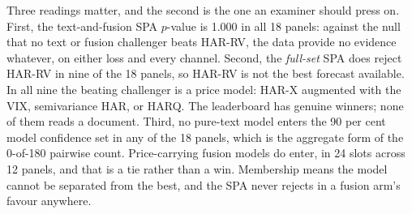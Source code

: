 Three readings matter, and the second is the one an examiner should press
on. First, the text-and-fusion SPA $p$-value is 1.000 in all 18 panels:
against the null that no text or fusion challenger beats HAR-RV, the data
provide no evidence whatever, on either loss and every channel. Second,
the \emph{full-set} SPA does reject HAR-RV in nine of the 18 panels, so
HAR-RV is not the best forecast available. In all nine the beating
challenger is a price model: HAR-X augmented with the VIX, semivariance
HAR, or HARQ. The leaderboard has genuine winners; none of them reads a
document. Third, no pure-text model enters the 90 per cent model confidence
set in any of the 18 panels, which is the aggregate form of the 0-of-180
pairwise count. Price-carrying fusion models do enter, in 24 slots across
12 panels, and that is a tie rather than a win. Membership means the model
cannot be separated from the best, and the SPA never rejects in a fusion
arm's favour anywhere.

